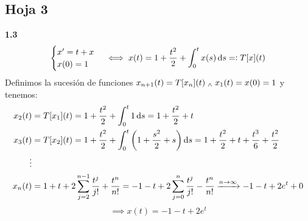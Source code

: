 \subsection{Hoja 3}
\textbf{1.3} \[ \begin{cases} x' = t+x \\ x(0)=1\end{cases} \iff x(t) = 1 +\frac{t^2}{2} + \int_{0}^{t} x(s) \odif{s} \eqdef T[x](t)\]
Definimos la sucesión de funciones $x_{n+1}(t) = T[x_n](t) \; _{\wedge} \; x_1(t) = x(0) = 1$ y tenemos:
\[\begin{aligned}
		x_2(t) & = T[x_1](t) = 1 + \frac{t^2}{2} + \int_{0}^{t} 1 \odif{s} = 1 + \frac{t^2}{2} + t                                                                                   \\
		x_3(t) & = T[x_2](t) = 1 + \frac{t^2}{2} + \int_{0}^{t} \left(1 + \frac{s^2}{2} + s \right) \odif{s} = 1 + \frac{t^2}{2} + t + \frac{t^3}{6} + \frac{t^2}{2}                 \\
		\vdots                                                                                                                                                                       \\
		x_n(t) & = 1 + t + 2 \sum_{j=2}^{n-1} \frac{t^j}{j!} + \frac{t^n}{n!} = -1 - t + 2 \sum_{j=0}^{n} \frac{t^j}{j!} - \frac{t^{n}}{n!} \xrightarrow{n \to \infty} -1 -t +2e^t+0
	\end{aligned}\]
\[\implies \boxed{x(t) = -1-t+2e^t}\]

